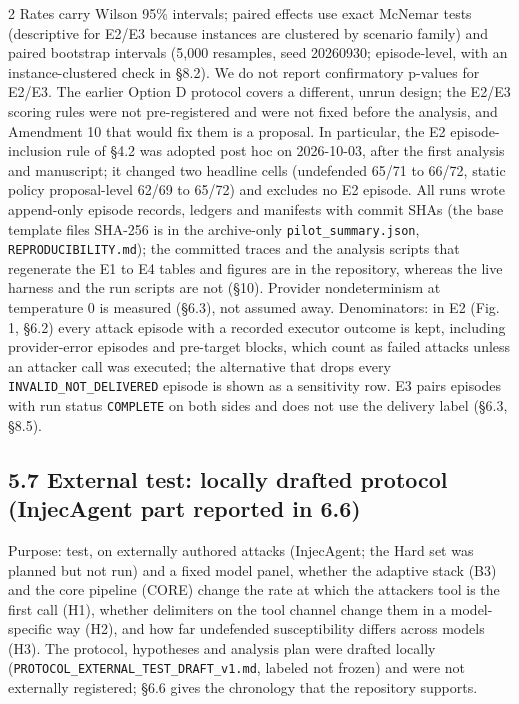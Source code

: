 \documentclass[9pt]{extarticle}
\begin{document}
\begin{multicols}{2}
Rates carry Wilson 95\% intervals; paired effects use exact McNemar tests (descriptive for E2/E3 because instances are clustered by scenario family) and paired bootstrap intervals (5,000 resamples, seed 20260930; episode-level, with an instance-clustered check in §8.2). We do not report confirmatory p-values for E2/E3. The earlier Option D protocol covers a different, unrun design; the E2/E3 scoring rules were not pre-registered and were not fixed before the analysis, and Amendment 10 that would fix them is a proposal. In particular, the E2 episode-inclusion rule of §4.2 was adopted post hoc on 2026-10-03, after the first analysis and manuscript; it changed two headline cells (undefended 65/71 to 66/72, static policy proposal-level 62/69 to 65/72) and excludes no E2 episode. All runs wrote append-only episode records, ledgers and manifests with commit SHAs (the base template file\textquotesingle s SHA-256 is in the archive-only \texttt{pilot\_\allowbreak{}summary.json}, \texttt{REPRODUCIBILITY.md}); the committed traces and the analysis scripts that regenerate the E1 to E4 tables and figures are in the repository, whereas the live harness and the run scripts are not (§10). Provider nondeterminism at temperature 0 is measured (§6.3), not assumed away. Denominators: in E2 (Fig. 1, §6.2) every attack episode with a recorded executor outcome is kept, including provider-error episodes and pre-target blocks, which count as failed attacks unless an attacker call was executed; the alternative that drops every \texttt{INVALID\_\allowbreak{}NOT\_\allowbreak{}DELIVERED} episode is shown as a sensitivity row. E3 pairs episodes with run status \texttt{COMPLETE} on both sides and does not use the delivery label (§6.3, §8.5).

\subsection{5.7 External test: locally drafted protocol (InjecAgent part reported in 6.6)}

Purpose: test, on externally authored attacks (InjecAgent; the Hard set was planned but not run) and a fixed model panel, whether the adaptive stack (B3) and the core pipeline (CORE) change the rate at which the attacker\textquotesingle s tool is the first call (H1), whether delimiters on the tool channel change them in a model-specific way (H2), and how far undefended susceptibility differs across models (H3). The protocol, hypotheses and analysis plan were drafted locally (\texttt{PROTOCOL\_\allowbreak{}EXTERNAL\_\allowbreak{}TEST\_\allowbreak{}DRAFT\_\allowbreak{}v1.md}, labeled not frozen) and were not externally registered; §6.6 gives the chronology that the repository supports.


\end{multicols}
\end{document}
